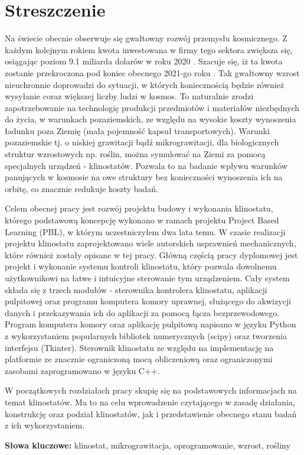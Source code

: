 \chapter*{Streszczenie}

Na świecie obecnie obserwuje się gwałtowny rozwój przemysłu kosmicznego. Z każdym kolejnym rokiem kwota inwestowana w firmy tego sektora zwiększa się, osiągając poziom 9.1 miliarda dolarów w roku 2020 \cite{bib:kosmos_raport_kwartalny_2021}. Szacuje się, iż ta kwota zostanie przekroczona pod koniec obecnego 2021-go roku \cite{bib:kosmos_raport_kwartalny_2021}. Tak gwałtowny wzrost nieuchronnie doprowadzi do sytuacji, w których koniecznością będzie również wysyłanie coraz większej liczby ludzi w kosmos. To naturalnie zrodzi zapotrzebowanie na technologię produkcji przedmiotów i materiałów niezbędnych do życia, w warunkach pozaziemskich, ze względu na wysokie koszty wynoszenia ładunku poza Ziemię (mała pojemność kapsuł transportowych). Warunki pozaziemskie tj. o niskiej grawitacji bądź mikrograwitacji, dla biologicznych struktur wzrostowych np. roślin, można symulować na Ziemi za pomocą specjalnych urządzeń - klinostatów. Pozwala to na badanie wpływu warunków panujących w kosmosie na owe struktury bez konieczności wynoszenia ich na orbitę, co znacznie redukuje koszty badań.  

Celem obecnej pracy jest rozwój projektu budowy i wykonania klinostatu, którego podstawową koncepcję wykonano w ramach projektu Project Based Learning (PBL), w którym uczestniczyłem dwa lata temu. W czasie realizacji projektu klinostatu zaprojektowano wiele autorskich usprawnień mechanicznych, które również zostały opisane w tej pracy. Główną częścią pracy dyplomowej jest projekt i wykonanie systemu kontroli klinostatu, który pozwala dowolnemu użytkownikowi na łatwe i intuicyjne sterowanie tym urządzeniem. Cały system składa się z trzech modułów - sterownika kontrolera klinostatu, aplikacji pulpitowej oraz programu komputera komory uprawnej, służącego do akwizycji danych i przekazywania ich do aplikacji za pomocą łącza bezprzewodowego. Program komputera komory oraz aplikację pulpitową napisano w języku Python z wykorzystaniem popularnych bibliotek numerycznych (scipy) oraz tworzenia interfejsu (Tkinter). Sterownik klinostatu ze względu na implementację na platformie ze znacznie ograniczoną mocą obliczeniową oraz ograniczonymi zasobami zaprogramowano w języku C++. 

W początkowych rozdziałach pracy skupię się na podstawowych informacjach na temat klinostatów. Ma to na celu wprowadzenie czytającego w zasadę działania, konstrukcję oraz podział klinostatów, jak i przedstawienie obecnego stanu badań z ich wykorzystaniem. 

{\bf Słowa kluczowe:} klinostat, mikrograwitacja, oprogramowanie, wzrost, rośliny

